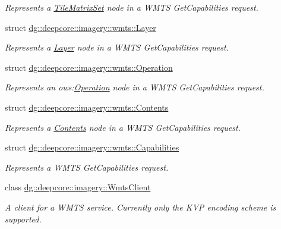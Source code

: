 \begin{DoxyCompactItemize}
\begin{DoxyCompactList}\small\item\em Represents a \hyperlink{structdg_1_1deepcore_1_1imagery_1_1wmts_1_1_tile_matrix_set}{Tile\+Matrix\+Set} node in a W\+M\+TS Get\+Capabilities request. \end{DoxyCompactList}\item 
struct \hyperlink{structdg_1_1deepcore_1_1imagery_1_1wmts_1_1_layer}{dg\+::deepcore\+::imagery\+::wmts\+::\+Layer}
\begin{DoxyCompactList}\small\item\em Represents a \hyperlink{structdg_1_1deepcore_1_1imagery_1_1wmts_1_1_layer}{Layer} node in a W\+M\+TS Get\+Capabilities request. \end{DoxyCompactList}\item 
struct \hyperlink{structdg_1_1deepcore_1_1imagery_1_1wmts_1_1_operation}{dg\+::deepcore\+::imagery\+::wmts\+::\+Operation}
\begin{DoxyCompactList}\small\item\em Represents an ows\+:\hyperlink{structdg_1_1deepcore_1_1imagery_1_1wmts_1_1_operation}{Operation} node in a W\+M\+TS Get\+Capabilities request. \end{DoxyCompactList}\item 
struct \hyperlink{structdg_1_1deepcore_1_1imagery_1_1wmts_1_1_contents}{dg\+::deepcore\+::imagery\+::wmts\+::\+Contents}
\begin{DoxyCompactList}\small\item\em Represents a \hyperlink{structdg_1_1deepcore_1_1imagery_1_1wmts_1_1_contents}{Contents} node in a W\+M\+TS Get\+Capabilities request. \end{DoxyCompactList}\item 
struct \hyperlink{structdg_1_1deepcore_1_1imagery_1_1wmts_1_1_capabilities}{dg\+::deepcore\+::imagery\+::wmts\+::\+Capabilities}
\begin{DoxyCompactList}\small\item\em Represents a W\+M\+TS Get\+Capabilities request. \end{DoxyCompactList}\item 
class \hyperlink{classdg_1_1deepcore_1_1imagery_1_1_wmts_client}{dg\+::deepcore\+::imagery\+::\+Wmts\+Client}
\begin{DoxyCompactList}\small\item\em A client for a W\+M\+TS service. Currently only the K\+VP encoding scheme is supported. \end{DoxyCompactList}\end{DoxyCompactItemize}
